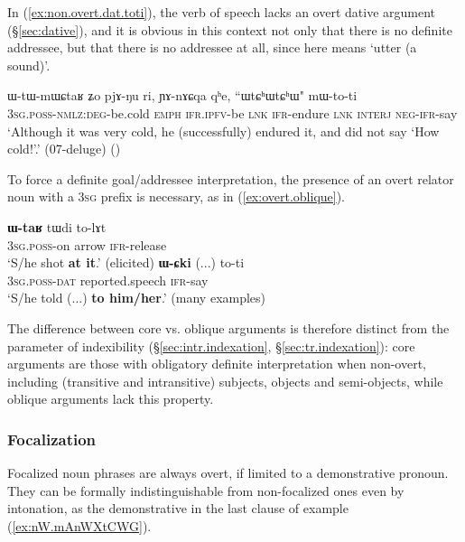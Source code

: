 In (\ref{ex:non.overt.dat.toti}), the verb of speech  lacks an overt dative argument (§\ref{sec:dative}), and it is obvious in this context not only that there is no definite addressee, but that there is no addressee at all, since  here means `utter (a sound)'. 

\begin{exe}
\ex \label{ex:non.overt.dat.toti}
\gll ɯ-tɯ-mɯɕtaʁ ʑo pjɤ-ŋu ri, ɲɤ-nɤɕqa qʰe, ``ɯtɕʰɯtɕʰɯ" mɯ-to-ti \\
\textsc{3sg}.\textsc{poss}-\textsc{nmlz}:\textsc{deg}-be.cold \textsc{emph} \textsc{ifr}.\textsc{ipfv}-be \textsc{lnk} \textsc{ifr}-endure \textsc{lnk} \textsc{interj} \textsc{neg}-\textsc{ifr}-say \\
\glt `Although it was very cold, he (successfully) endured it, and did not say `How cold!'.' (07-deluge)
()
\end{exe}

To force a definite goal/addressee interpretation, the presence of an overt relator noun with a \textsc{3sg} prefix is necessary, as in (\ref{ex:overt.oblique}).

\begin{exe}
\ex \label{ex:overt.oblique}
\begin{xlist}
\ex \label{ex:WtaR.tWdi.tolAt}
\gll \textbf{ɯ-taʁ} tɯdi to-lɤt \\
\textsc{3sg}.\textsc{poss}-on arrow \textsc{ifr}-release \\
\glt `S/he shot \textbf{at it}.' (elicited)
\ex  \label{ex:WCki.toti2}
\gll \textbf{ɯ-ɕki} (...) to-ti \\
\textsc{3sg}.\textsc{poss}-\textsc{dat} reported.speech \textsc{ifr}-say \\
\textsc{\glt} `S/he told (...) \textbf{to him/her}.' (many examples)
\end{xlist}
\end{exe}

The difference between core vs. oblique arguments is therefore distinct from the parameter of indexibility (§\ref{sec:intr.indexation}, §\ref{sec:tr.indexation}): core arguments are those with obligatory definite interpretation when non-overt, including (transitive and intransitive) subjects, objects and semi-objects, while oblique arguments lack this property.

\subsubsection{Focalization} \label{sec:focalization.overt}
Focalized noun phrases are always overt, if limited to a demonstrative pronoun. They can be formally indistinguishable from non-focalized ones even by intonation, as the demonstrative  in the last clause of example (\ref{ex:nW.mAnWXtCWG}).

